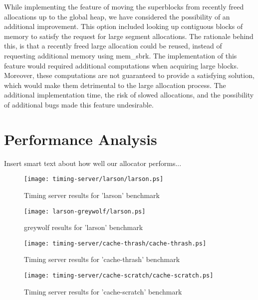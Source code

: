 \documentclass{article}
\begin{document}
While implementing the feature of moving the superblocks from recently freed 
allocations up to the global heap, we have considered the possibility of an 
additional improvement. This option included looking up contiguous blocks
of memory to satisfy the request for large segment allocations. The rationale
behind this, is that a recently freed large allocation could be reused, instead
of requesting additional memory using mem\_sbrk. The implementation of this 
feature would required additional computations when acquiring large blocks.
Moreover, these computations are not guaranteed to provide a satisfying 
solution, which would make them detrimental to the large allocation process.
The additional implementation time, the risk of slowed allocations, and the 
possibility of additional bugs made this feature undesirable.

\newpage
\section{Performance Analysis}
\label{sec:performance}

Insert smart text about how well our allocator performs...

\begin{figure}[h]
    \centering
    \texttt{[image: timing-server/larson/larson.ps]}
    \caption{Timing server results for 'larson' benchmark}
    \label{fig:t-larson}
\end{figure}

\begin{figure}[h]
    \centering
    \texttt{[image: larson-greywolf/larson.ps]}
    \caption{greywolf results for 'larson' benchmark}
    \label{fig:g-larson}
\end{figure}

\begin{figure}[h]
    \centering
    \texttt{[image: timing-server/cache-thrash/cache-thrash.ps]}
    \caption{Timing server results for 'cache-thrash' benchmark}
    \label{fig:t-cache-thrash}
\end{figure}

\begin{figure}[h]
    \centering
    \texttt{[image: timing-server/cache-scratch/cache-scratch.ps]}
    \caption{Timing server results for 'cache-scratch' benchmark}
    \label{fig:t-cache-scratch}
\end{figure}
\end{document}
